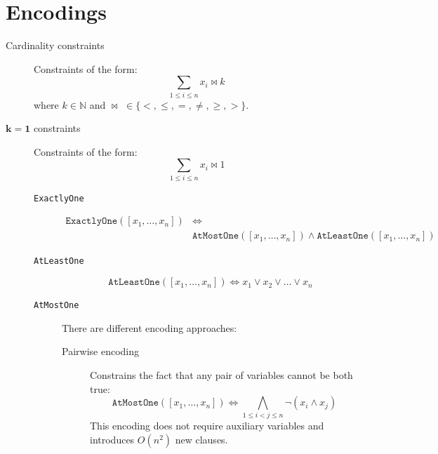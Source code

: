 \section{Encodings}

\begin{description}
    \item[Cardinality constraints] 
        Constraints of the form:
        \[ \sum_{1 \leq i \leq n} x_i \bowtie k \]
        where $k \in \mathbb{N}$ and $\bowtie\,\, \in \{ <, \leq, =, \neq, \geq, > \}$.

    \item[$\mathbf{k=1}$ constraints] 
        Constraints of the form:
        \[ \sum_{1 \leq i \leq n} x_i \bowtie 1 \]

        \begin{description}
            \item[\texttt{ExactlyOne}] 
                \[
                    \begin{split}
                        \texttt{ExactlyOne}([x_1, \dots, x_n]) &\iff \\
                        &\texttt{AtMostOne}([x_1, \dots, x_n]) \land \texttt{AtLeastOne}([x_1, \dots, x_n]) 
                    \end{split}
                \]

            \item[\texttt{AtLeastOne}] 
                \[ \texttt{AtLeastOne}([x_1, \dots, x_n]) \iff x_1 \vee x_2 \vee \dots \vee x_n \]

            \item[\texttt{AtMostOne}] 
                There are different encoding approaches:

                \begin{description}
                    \item[Pairwise encoding] 
                        Constrains the fact that any pair of variables cannot be both true:
                        \[ \texttt{AtMostOne}([x_1, \dots, x_n]) \iff \bigwedge_{1 \leq i < j \leq n} \lnot (x_i \land x_j) \]
                        This encoding does not require auxiliary variables and introduces $O(n^2)$ new clauses.


\end{description}
\end{description}
\end{description}
